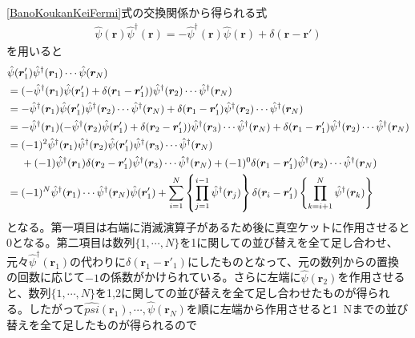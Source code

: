 \documentclass[dvipdfmx, 11pt, a4paper]{jsarticle}
\theoremstyle{definition}
\numberwithin{equation}{section}
\begin{document}
    \begin{derivationBox}
        \eqref{BanoKoukanKeiFermi}式の交換関係から得られる式
        \begin{align}
            \hat{\psi}(\bm{r})\hat{\psi}^\dagger(\bm{r})=-\hat{\psi}^\dagger(\bm{r})\hat{\psi}(\bm{r}) + \delta(\bm{r}-\bm{r}')
        \end{align}
        を用いると
        \begin{align}
            &\hat{\psi}(\bm{r}'_1) \hat{\psi}^\dagger(\bm{r}_1)\cdots\hat{\psi}(\bm{r}_N) \notag \\
            &= (-\hat{\psi}^\dagger(\bm{r}_1)\hat{\psi}(\bm{r}_1') + \delta(\bm{r}_1-\bm{r}'_1))\hat{\psi}^\dagger(\bm{r}_2)\cdots\hat{\psi}^\dagger(\bm{r}_N) \notag \\
            &= -\hat{\psi}^\dagger(\bm{r}_1)\hat{\psi}(\bm{r}_1') \hat{\psi}^\dagger(\bm{r}_2)\cdots\hat{\psi}^\dagger(\bm{r}_N) +  \delta(\bm{r}_1-\bm{r}'_1)\hat{\psi}^\dagger(\bm{r}_2)\cdots\hat{\psi}^\dagger(\bm{r}_N) \notag  \\
            &= -\hat{\psi}^\dagger(\bm{r}_1)( -\hat{\psi}^\dagger(\bm{r}_2)\hat{\psi}(\bm{r}_1') + \delta(\bm{r}_2-\bm{r}'_1))\hat{\psi}^\dagger(\bm{r}_3)\cdots\hat{\psi}^\dagger(\bm{r}_N) +  \delta(\bm{r}_1-\bm{r}'_1)\hat{\psi}^\dagger(\bm{r}_2)\cdots\hat{\psi}^\dagger(\bm{r}_N) \notag \\
            &= (-1)^2\hat{\psi}^\dagger(\bm{r}_1)\hat{\psi}^\dagger(\bm{r}_2)\hat{\psi}(\bm{r}_1') \hat{\psi}^\dagger(\bm{r}_3)\cdots\hat{\psi}^\dagger(\bm{r}_N) \notag \\
            &\ \ \ \ +(-1)\hat{\psi}^\dagger(\bm{r}_1)\delta(\bm{r}_2-\bm{r}'_1)\hat{\psi}^\dagger(\bm{r}_3)\cdots\hat{\psi}^\dagger(\bm{r}_N) + (-1)^0 \delta(\bm{r}_1-\bm{r}'_1)\hat{\psi}^\dagger(\bm{r}_2)\cdots\hat{\psi}^\dagger(\bm{r}_N) \notag \\
            &= (-1)^N \hat{\psi}^\dagger(\bm{r}_1)\cdots \hat{\psi}^\dagger(\bm{r}_N)\hat{\psi}(\bm{r}'_1) + \sum_{i=1}^{N} \left\{ \prod_{j=1}^{i-1} \hat{\psi}^\dagger(\bm{r}_j)\right\}\delta(\bm{r}_i - \bm{r}'_1) \left\{ \prod_{k=i+1}^{N} \hat{\psi}^\dagger(\bm{r}_k) \right\}
        \end{align}
        となる。第一項目は右端に消滅演算子があるため後に真空ケットに作用させると0となる。第二項目は数列$\{1,\cdots,N\}$を1に関しての並び替えを全て足し合わせ、元々$\hat{\psi}^\dagger(\bm{r}_1)$の代わりに$\delta(\bm{r}_1-\bm{r}'_1)$にしたものとなって、元の数列からの置換の回数に応じて$-1$の係数がかけられている。さらに左端に$\hat{\psi}(\bm{r}_2)$を作用させると、数列$\{1,\cdots,N\}$を1,2に関しての並び替えを全て足し合わせたものが得られる。したがって$\hat{psi}(\bm{r}_1),\cdots,\hat{\psi}(\bm{r}_N)$を順に左端から作用させると1~Nまでの並び替えを全て足したものが得られるので

\end{derivationBox}
\end{document}

